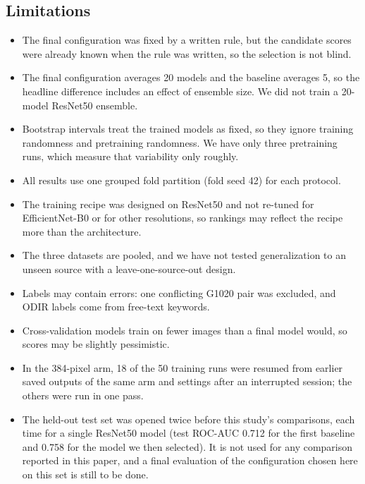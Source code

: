 \subsection{Limitations}
\begin{itemize}
\item The final configuration was fixed by a written rule, but the candidate scores were already known when the rule was written, so the selection is not blind.
\item The final configuration averages 20 models and the baseline averages 5, so the headline difference includes an effect of ensemble size. We did not train a 20-model ResNet50 ensemble.
\item Bootstrap intervals treat the trained models as fixed, so they ignore training randomness and pretraining randomness. We have only three pretraining runs, which measure that variability only roughly.
\item All results use one grouped fold partition (fold seed 42) for each protocol.
\item The training recipe was designed on ResNet50 and not re-tuned for EfficientNet-B0 or for other resolutions, so rankings may reflect the recipe more than the architecture.
\item The three datasets are pooled, and we have not tested generalization to an unseen source with a leave-one-source-out design.
\item Labels may contain errors: one conflicting G1020 pair was excluded, and ODIR labels come from free-text keywords.
\item Cross-validation models train on fewer images than a final model would, so scores may be slightly pessimistic.
\item In the 384-pixel arm, 18 of the 50 training runs were resumed from earlier saved outputs of the same arm and settings after an interrupted session; the others were run in one pass.
\item The held-out test set was opened twice before this study's comparisons, each time for a single ResNet50 model (test ROC-AUC 0.712 for the first baseline and 0.758 for the model we then selected). It is not used for any comparison reported in this paper, and a final evaluation of the configuration chosen here on this set is still to be done.
\end{itemize}


